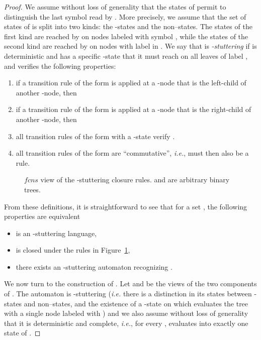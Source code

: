 \documentclass{CSML}
\newcommand\fcns{\ensuremath{\mathit{fcns}}\xspace}
\begin{document}
\begin{proof}
We assume without loss of generality that the states of  permit to
distinguish the last symbol read by .  More precisely, we assume that the
set of states of  is split into two kinds: the -states and the
non--states.  The states of the first kind are reached by  on nodes
labeled with symbol , while the states of the second kind are reached by
 on nodes with label in .  We say that  is
\emph{-stuttering} if  is deterministic and has a specific -state
 that it must reach on all leaves of label , and verifies the
following properties:
\begin{enumerate} 
\item if a transition rule of the form  
is applied at a -node that is the left-child of another -node, then 
\item if a transition rule of the form  is applied at a -node that is the right-child of another -node, then 
\item all transition rules of the form  with  a -state
  verify .
\item \label{it-commutativity}
 all transition rules of the form  are ``commutative'',
  \textit{i.e.},  must then also be a rule.
\end{enumerate}


\begin{figure}
\small

\caption{\fcns view of the -stuttering closure rules.  and  are
  arbitrary binary trees.}
\label{fig-rules-fcns}
\end{figure}

\noindent From these definitions, it is straightforward to see that 
for a set , the following properties are equivalent
\begin{itemize}
\item  is an -stuttering language,
\item  is closed under the rules in Figure~\ref{fig-rules-fcns},
\item there exists an -stuttering automaton recognizing .
\end{itemize}

\medskip

We now turn to the construction of .
Let  
and 
be the  views of the two components of .
The automaton  is -stuttering (\textit{i.e.} there is a distinction in its
states between -states and non--states, and the existence of a
-state  on which  evaluates the tree with a single
node labeled with ) and we also assume without loss of generality that it
is deterministic and complete, \textit{i.e.}, for every ,  evaluates into exactly one state of .


\end{proof}
\end{document}

